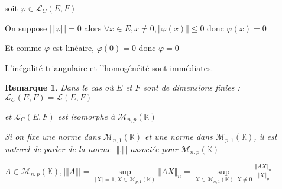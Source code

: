 \documentclass[a4paper,12pt]{book}
\newcommand{\Pre}[1]{\begin{tcolorbox}[sharp corners, colback=white,colframe=green!60!green!30!black!75, title=Preuve]#1\end{tcolorbox}}
\newtheorem{Rem}{Remarque}[section]
\def\K{\mathbb{K}}
\begin{document}
\Pre{soit $\varphi\in\mathcal{L}_C(E,F)$\par On suppose $\vert\Vert\varphi\Vert\vert=0$ alors $\forall x\in E, x\neq 0, \Vert \varphi(x)\Vert\leq 0$ donc $\varphi(x)=0$ \par Et comme $\varphi$ est linéaire, $\varphi(0)=0$ donc $\varphi=0$ \par L'inégalité triangulaire et l'homogénéité sont immédiates.}
\begin{Rem}
Dans le cas où $E$ et $F$ sont de dimensions finies : $\mathcal{L}_C(E,F)=\mathcal{L}(E,F)$ \par et $\mathcal{L}_C(E,F)$ est isomorphe à $\mathcal{M}_{n,p}(\K)$ \par Si on fixe une norme dans $\mathcal{M}_{n,1}(\K)$ et une norme dans $\mathcal{M}_{p,1}(\K)$, il est naturel de parler de la norme $\vert\Vert.\Vert\vert$ associée pour $\mathcal{M}_{n,p}(\K)$ \par $A\in\mathcal{M}_{n,p}(\K), \vert\Vert A\Vert\vert =\sup\limits_{\Vert X\Vert=1, X\in\mathcal{M}_{p,1}(\K)} \Vert AX\Vert_n = \sup\limits_{X\in\mathcal{M}_{n,1}(\K), X\neq 0} \frac{\Vert AX\Vert_n}{\Vert X\Vert_p}$
\end{Rem}
\end{document}
